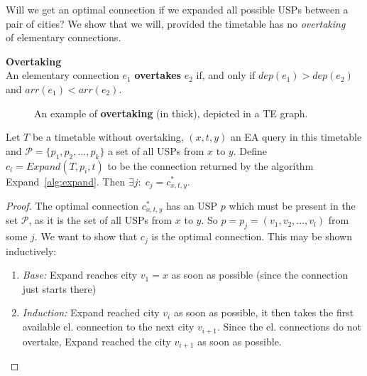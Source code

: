 	\noindent Will we get an optimal connection if we expanded all possible USPs between a pair of cities? We show that we will, provided the timetable has no \textit{overtaking}~\cite{timetablemodelsalgs07}~\cite{tdroute09} of elementary connections.
	
	\begin{definition}
        \textbf{Overtaking} \\
		An elementary connection $e_{1}$ \textbf{overtakes} $e_{2}$ if, and only if $dep(e_{1}) > dep(e_{2})$ and $arr(e_{1}) < arr(e_{2})$. 
    \end{definition}
    
    \begin{figure}[h!]
		\begin{center}
		\end{center}
		\caption{\label{fig:overtake} An example of \textcolor{green!80!black}{\textbf{overtaking}} (in thick), depicted in a TE graph.}
	\end{figure}
    
    \begin{lemma}
    	\label{lemma:expandusp}
    	Let $T$ be a timetable without overtaking, $(x, t, y)$ an EA query in this timetable and $\mathcal{P} = \{p_{1}, p_{2}, ..., p_{k}\}$ a set of all USPs from $x$ to $y$. Define $c_{i} = Expand(T, p_{i}, t)$ to be the connection returned by the algorithm Expand~\ref{alg:expand}. Then $\exists j:\; c_{j} = c_{x, t, y}^{*}$.
    \end{lemma}
    \begin{proof}
    	The optimal connection $c_{x, t, y}^{*}$ has an USP $p$ which must be present in the set $\mathcal{P}$, as it is the set of all USPs from $x$ to $y$. So $p = p_{j} = (v_{1}, v_{2},..., v_{l})$ from some $j$. We want to show that $c_{j}$ is the optimal connection. This may be shown inductively:
    	\begin{enumerate}
    		\item \textit{Base:} Expand reaches city $v_{1} = x$ as soon as possible (since the connection just starts there)
    		\item \textit{Induction:} Expand reached city $v_{i}$ as soon as possible, it then takes the first available el. connection to the next city $v_{i + 1}$. Since the el. connections do not overtake, Expand reached the city $v_{i + 1}$ as soon as possible.
    	\end{enumerate}
    \end{proof}
    

